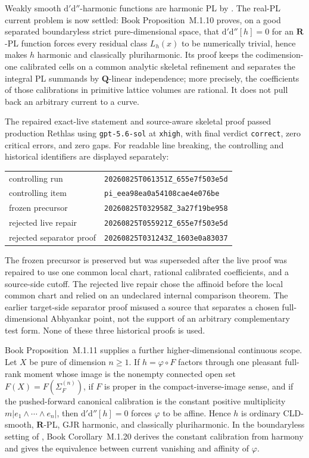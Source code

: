 \documentclass[11pt,a4paper]{article}
\theoremstyle{definition}
\theoremstyle{remark}
\newcommand{\rd}{\mathrm d}
\newcommand{\dprime}{\rd'}
\newcommand{\ddprime}{\rd''}
\newcommand{\dprimeddprime}{\dprime\ddprime}
\begin{document}
Weakly smooth \(\dprimeddprime\)-harmonic functions are harmonic PL by
\cite[Proposition~10.17]{GJR26}.  The real-PL current problem is now settled:
Book Proposition~M.1.10 proves, on a good separated
boundaryless strict pure-dimensional space, that
\(\dprimeddprime[h]=0\) for an \(\mathbf R\)-PL function forces every residual
class \(L_h(x)\) to be numerically trivial, hence makes \(h\) harmonic and
classically pluriharmonic.  Its proof keeps the codimension-one calibrated
cells on a common analytic skeletal refinement and separates the
integral PL summands by \(\mathbf Q\)-linear independence; more precisely, the
coefficients of those calibrations in primitive lattice volumes are rational.
It does not pull back an arbitrary current to a curve.

The repaired exact-live statement and source-aware skeletal proof passed
production Rethlas using \texttt{gpt-5.6-sol} at \texttt{xhigh}, with final
verdict \texttt{correct}, zero critical errors, and zero gaps.  For readable
line breaking, the controlling and historical identifiers are displayed
separately:
\begin{center}
\small
\begin{tabular}{@{}ll@{}}
controlling run & \nolinkurl{20260825T061351Z_655e7f503e5d}\tabularnewline
controlling item & \nolinkurl{pi_eea98ea0a54108cae4e076be}\tabularnewline
frozen precursor & \nolinkurl{20260825T032958Z_3a27f19be958}\tabularnewline
rejected live repair & \nolinkurl{20260825T055921Z_655e7f503e5d}\tabularnewline
rejected separator proof & \nolinkurl{20260825T031243Z_1603e0a83037}
\end{tabular}
\end{center}
The frozen precursor is preserved but was superseded after the live proof was
repaired to use one common local chart, rational calibrated coefficients, and
a source-side cutoff.  The rejected live repair chose the affinoid before the
local common chart and relied on an undeclared internal comparison theorem.
The earlier target-side separator proof misused a source that separates a
chosen full-dimensional Abhyankar point, not the support of an arbitrary
complementary test form.  None of these three historical proofs is used.

Book Proposition~M.1.11 supplies a further
higher-dimensional continuous scope.  Let \(X\) be pure of dimension
\(n\geq 1\).  If \(h=\varphi\circ F\) factors through one pleasant full-rank
moment whose image is the nonempty connected open set
\(F(X)=F(\Sigma_F^{(n)})\), if \(F\) is proper in the compact-inverse-image
sense, and if the pushed-forward canonical calibration is the constant
positive multiplicity \(m|e_1\wedge\cdots\wedge e_n|\), then
\(\dprimeddprime[h]=0\) forces \(\varphi\) to be affine.  Hence \(h\) is ordinary
CLD-smooth, \(\mathbf R\)-PL, GJR harmonic, and classically pluriharmonic.  In
the boundaryless setting of ,
Book Corollary~M.1.20 derives the
constant calibration from harmony and gives the equivalence between current
vanishing and affinity of \(\varphi\).
\end{document}
